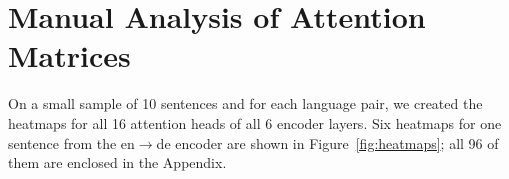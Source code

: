 \documentclass[11pt,a4paper]{article}
\newcommand\footurl[1]{\footnote{\url{#1}}}
\newcommand{\words}{\emph{input states}\xspace}
\newcommand{\states}{\emph{output states}\xspace}
\def\DM#1{{\color{red}DM: \it #1}}
\def\DM#1{}
\begin{document}
   
\DM{Jak se to lisi pro ruzne cilove a pro ruzne zdrojove jazyky?}

\DM{kdyz se to agreguje, tak zjistime, ze vsechno ve vysledku koukalo skoro vsude.}

\section{Manual Analysis of Attention Matrices}
\label{sec:analysis}

On a small sample of 10 sentences and for each language pair, we created the heatmaps for all 16 attention heads of all 6 encoder layers.
Six heatmaps for one sentence from the en$\rightarrow$de encoder are shown in Figure~\ref{fig:heatmaps};
all 96 of them are enclosed in the Appendix.

\end{document}
